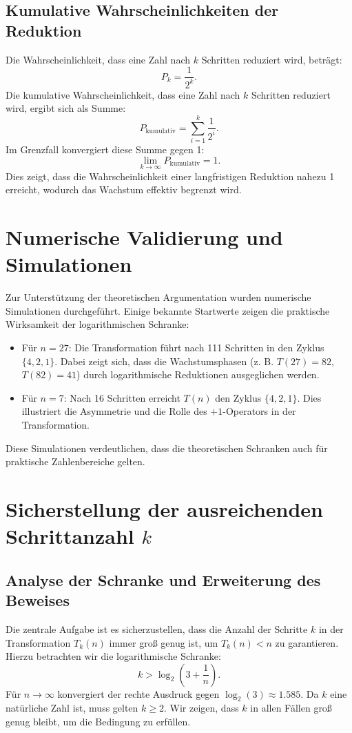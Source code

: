 \documentclass[a4paper,12pt]{article}
\begin{document}
\subsection{Kumulative Wahrscheinlichkeiten der Reduktion}
Die Wahrscheinlichkeit, dass eine Zahl nach $k$ Schritten reduziert wird, beträgt:
\[
P_k = \frac{1}{2^k}.
\]
Die kumulative Wahrscheinlichkeit, dass eine Zahl nach $k$ Schritten reduziert wird, ergibt sich als Summe:
\[
P_{\text{kumulativ}} = \sum_{i=1}^k \frac{1}{2^i}.
\]
Im Grenzfall konvergiert diese Summe gegen 1:
\[
\lim_{k \to \infty} P_{\text{kumulativ}} = 1.
\]
Dies zeigt, dass die Wahrscheinlichkeit einer langfristigen Reduktion nahezu 1 erreicht, wodurch das Wachstum effektiv begrenzt wird.

\section{Numerische Validierung und Simulationen}
Zur Unterstützung der theoretischen Argumentation wurden numerische Simulationen durchgeführt. Einige bekannte Startwerte zeigen die praktische Wirksamkeit der logarithmischen Schranke:

\begin{itemize}
    \item Für \( n = 27 \): Die Transformation führt nach 111 Schritten in den Zyklus \( \{4, 2, 1\} \). Dabei zeigt sich, dass die Wachstumsphasen (z. B. \( T(27) = 82 \), \( T(82) = 41 \)) durch logarithmische Reduktionen ausgeglichen werden.
    \item Für \( n = 7 \): Nach 16 Schritten erreicht \( T(n) \) den Zyklus \( \{4, 2, 1\} \). Dies illustriert die Asymmetrie und die Rolle des \(+1\)-Operators in der Transformation.
\end{itemize}

Diese Simulationen verdeutlichen, dass die theoretischen Schranken auch für praktische Zahlenbereiche gelten.

\section{Sicherstellung der ausreichenden Schrittanzahl \( k \)}

\subsection{Analyse der Schranke und Erweiterung des Beweises}
Die zentrale Aufgabe ist es sicherzustellen, dass die Anzahl der Schritte \( k \) in der Transformation \( T_k(n) \) immer groß genug ist, um \( T_k(n) < n \) zu garantieren. Hierzu betrachten wir die logarithmische Schranke:
\[
k > \log_2\left(3 + \frac{1}{n}\right).
\]
Für \( n \to \infty \) konvergiert der rechte Ausdruck gegen \(\log_2(3) \approx 1.585\). Da \( k \) eine natürliche Zahl ist, muss gelten \( k \geq 2 \). Wir zeigen, dass \( k \) in allen Fällen groß genug bleibt, um die Bedingung zu erfüllen.
\end{document}
